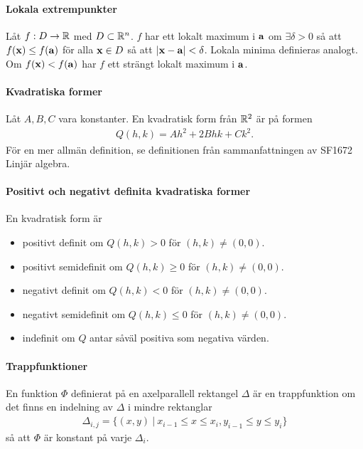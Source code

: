 \paragraph{Lokala extrempunkter}
Låt $f: D\to\mathbb{R}$ med $D\subset\mathbb{R}^n$. $f$ har ett lokalt maximum i $\vb{a}$ om $\exists\delta > 0$ så att $f(\vb{x})\leq f(\vb{a})$ för alla $\vb{x}\in D$ så att $\abs{\vb{x} - \vb{a}} < \delta$. Lokala minima definieras analogt. Om $f(\vb{x}) < f(\vb{a})$ har $f$ ett strängt lokalt maximum i $\vb{a}$.

\paragraph{Kvadratiska former}
Låt $A, B, C$ vara konstanter. En kvadratisk form från $\mathbb{R}^2$ är på formen
\begin{align*}
	Q(h, k) = Ah^2 + 2Bhk + Ck^2.
\end{align*}
För en mer allmän definition, se definitionen från sammanfattningen av SF1672 Linjär algebra.

\paragraph{Positivt och negativt definita kvadratiska former}
En kvadratisk form är
\begin{itemize}
	\item positivt definit om $Q(h, k) > 0$ för $(h, k)\neq (0,0)$.
	\item positivt semidefinit om $Q(h, k)\geq 0$ för $(h, k)\neq (0,0)$.
	\item negativt definit om $Q(h, k) < 0$ för $(h, k)\neq (0,0)$.
	\item negativt semidefinit om $Q(h, k)\leq 0$ för $(h, k)\neq (0,0)$.
	\item indefinit om $Q$ antar såväl positiva som negativa värden.
\end{itemize}

\paragraph{Trappfunktioner}
En funktion $\Phi$ definierat på en axelparallell rektangel $\Delta$ är en trappfunktion om det finns en indelning av $\Delta$ i mindre rektanglar
\begin{align*}
	\Delta_{i, j} = \{(x, y)\ |\ x_{i - 1}\leq x\leq x_i, y_{i - 1}\leq y\leq y_i\}
\end{align*}
så att $\Phi$ är konstant på varje $\Delta_i$.

